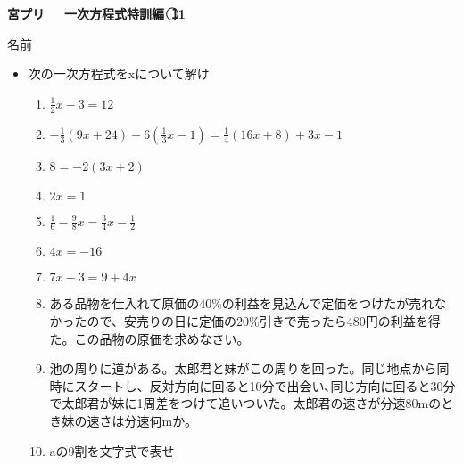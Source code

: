 \documentclass[a4paper,fleqn,papersize,15pt]{jsarticle}
\begin{document}
 \begin{center}
   \LARGE\textbf{宮プリ　~一次方程式特訓編~\textcircled{\scriptsize 11}}
     \begin{flushright}
       名前\underline{\hspace{8zw}}
     \end{flushright}
 \end{center}

 \begin{itemize}
   \item 次の一次方程式をxについて解け
   \begin{enumerate}
\item $\frac{1}{2}x-3=12$ \begin{flushright}\framebox[8em]{\rule{0pt}{6ex}}\end{flushright} %
\item $- \frac{1}{3}(9x+24)+6(\frac{1}{3} x-1)= \frac{1}{4}(16x+8)+3x-1$ \begin{flushright}\framebox[8em]{\rule{0pt}{6ex}}\end{flushright} %
\item $8=-2(3x+2)$ \begin{flushright}\framebox[8em]{\rule{0pt}{6ex}}\end{flushright} %
\item $2x=1$ \begin{flushright}\framebox[8em]{\rule{0pt}{6ex}}\end{flushright} %
\item $\frac{1}{6} - \frac{9}{8} x= \frac{3}{4} x- \frac{1}{2}$ \begin{flushright}\framebox[8em]{\rule{0pt}{6ex}}\end{flushright} %
\item $4x=-16$ \begin{flushright}\framebox[8em]{\rule{0pt}{6ex}}\end{flushright} %
\item $7x-3=9+4x$ \begin{flushright}\framebox[8em]{\rule{0pt}{6ex}}\end{flushright} %
\item ある品物を仕入れて原価の40\%の利益を見込んで定価をつけたが売れなかったので、安売りの日に定価の20\%引きで売ったら480円の利益を得た。この品物の原価を求めなさい。 \vfill \begin{flushright}\framebox[8em]{\rule{0pt}{6ex}}\end{flushright} %
\item 池の周りに道がある。太郎君と妹がこの周りを回った。同じ地点から同時にスタートし、反対方向に回ると10分で出会い､同じ方向に回ると30分で太郎君が妹に1周差をつけて追いついた。太郎君の速さが分速80mのとき妹の速さは分速何mか。 \vfill \begin{flushright}\framebox[8em]{\rule{0pt}{6ex}}\end{flushright} %
\item aの9割を文字式で表せ \vfill \begin{flushright}\framebox[8em]{\rule{0pt}{6ex}}\end{flushright} %
\end{enumerate}
    \vfill
\end{itemize}
\end{document}
